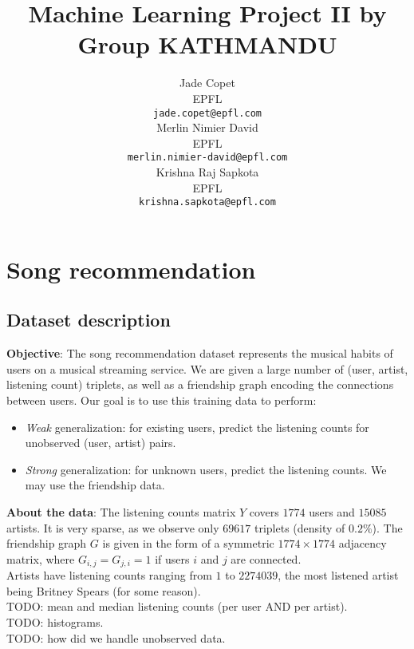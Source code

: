 \documentclass{article}
\title{Machine Learning Project II by Group KATHMANDU}
\author{
  Jade Copet\\
  EPFL \\
  \texttt{jade.copet@epfl.com} \\
  \And
  Merlin Nimier David\\
  EPFL \\
  \texttt{merlin.nimier-david@epfl.com} \\
  \And
  Krishna Raj Sapkota\\
  EPFL \\
  \texttt{krishna.sapkota@epfl.com} \\
}
\begin{document}
\maketitle



\begin{abstract}
\end{abstract}



\section{Song recommendation}

  \subsection{Dataset description}
  \textbf{Objective}: The song recommendation dataset represents the musical habits of users on a musical streaming service. We are given a large number of (user, artist, listening count) triplets, as well as a friendship graph encoding the connections between users. Our goal is to use this training data to perform:

  \begin{itemize}
    \item \textit{Weak} generalization: for existing users, predict the listening counts for unobserved (user, artist) pairs.
    \item \textit{Strong} generalization: for unknown users, predict the listening counts. We may use the friendship data.
  \end{itemize}

  \textbf{About the data}: The listening counts matrix $Y$ covers $1774$ users and $15085$ artists. It is very sparse, as we observe only $69617$ triplets (density of $0.2\%$). The friendship graph $G$ is given in the form of a symmetric $1774 \times 1774$ adjacency matrix, where $G_{i, j} = G_{j, i} = 1$ if users $i$ and $j$ are connected.\\

  Artists have listening counts ranging from $1$ to $2274039$, the most listened artist being Britney Spears (for some reason).\\
  TODO: mean and median listening counts (per user AND per artist).\\
  TODO: histograms.\\

  TODO: how did we handle unobserved data.
\end{document}
